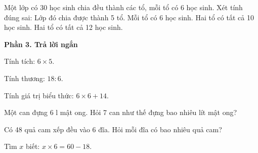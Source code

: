 \begin{ex} %
Một lớp có 30 học sinh chia đều thành các tổ, mỗi tổ có 6 học sinh. Xét tính đúng sai:
\choiceTF
{\True Lớp đó chia được thành 5 tổ.}
{\True Mỗi tổ có 6 học sinh.}
{Hai tổ có tất cả 10 học sinh.}
{\True Hai tổ có tất cả 12 học sinh.}
\end{ex}

\textbf{Phần 3. Trả lời ngắn}

\begin{ex} %
Tính tích: $6 \times 5$.
\end{ex}

\begin{ex} %
Tính thương: $18 : 6$.
\end{ex}

\begin{ex} %
Tính giá trị biểu thức: $6 \times 6 + 14$.
\end{ex}

\begin{ex} %
Một can đựng $6\text{ l}$ mật ong. Hỏi 7 can như thế đựng bao nhiêu lít mật ong?
\end{ex}

\begin{ex} %
Có 48 quả cam xếp đều vào 6 đĩa. Hỏi mỗi đĩa có bao nhiêu quả cam?
\end{ex}

\begin{ex} %
Tìm $x$ biết: $x \times 6 = 60 - 18$.
\end{ex}
